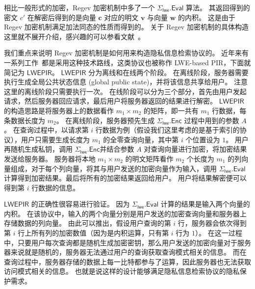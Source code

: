相比一般形式的加密，Regev 加密机制中多了一个 $\Sigma_{\mathsf{lwe}}.\mathsf{Eval}$ 算法。
其返回得到的密文 $c'$ 在解密后得到的是向量 $\mathbf{c}$ 对应的明文 $\mathbf{v}$  与向量 $\mathbf{w}$ 的内积。
这是由于 Regev 加密机制满足加法同态的性质而得到的。
关于 Regev 加密机制的具体构造这里就不展开介绍，感兴趣的可以参看文献~\cite{regev2009lattices}。

我们重点来说明 Regev 加密机制是如何用来构造隐私信息检索协议的。
近年来有一系列工作~\cite{davidson2023frodopir,henzinger2023one,zhou2023optimal}都是采用这种技术路线，这类协议也被称作 LWE-based PIR，下面就简记为 $\mathsf{LWEPIR}$。
$\mathsf{LWEPIR}$ 分为离线和在线两个阶段。
在离线阶段，服务器需要执行生成全局公共状态信息 (global public state)，并将该信息共享给用户。
注意这里的离线阶段只需要执行一次。
在线阶段可以分为三个部分，首先由用户发起请求，然后服务器回应请求，最后用户将服务器返回的结果进行解密。
$\mathsf{LWEPIR}$ 的构造思路是将服务器上的数据看作 $m_1 \times m_2$ 的矩阵，即一共有 $m_1$ 行数据，每条数据长度为 $m_2$。
在离线阶段，服务器预先生成 $\Sigma_{\mathsf{lwe}}.\mathsf{Enc}$ 过程中用到的参数 $A$。
在查询过程中，以请求第 $i$ 行数据为例（假设我们这里考虑的是基于索引的协议），用户只需要生成长度为 $m_1$ 的全零查询向量，其中第 $i$ 个位置设为 $1$。
用户再随机生成私钥，调用 $\Sigma_{\mathsf{lwe}}.\mathsf{Enc}$并结合参数 $A$ 对查询向量进行加密，将加密结果发送给服务器。
服务器将本地 $m_1 \times m_2$ 的明文矩阵看作 $m_2$ 个长度为 $m_1$ 的列向量组成，对于每个列向量，将其与用户发送的加密向量作为输入，调用 $\Sigma_{\mathsf{lwe}}.\mathsf{Eval}$ 计算得到加密结果。最后将所有的加密结果返回给用户。
用户将结果解密便可以得到第 $i$ 行数据的信息。

$\mathsf{LWEPIR}$ 的正确性很容易进行验证。
因为 $\Sigma_{\mathsf{lwe}}.\mathsf{Eval}$ 计算的结果是输入两个向量的内积。
在该协议中，输入的两个向量分别是用户发送的加密查询向量和服务器上存储数据的列向量。
由此可以推出，假设用户查询的第 $i$ 行，服务器会依次得到第 $i$ 行上所有列的加密数值（因为是内积运算，只有第 $i$ 行为 $1$）。
在这一过程中，只要用户每次查询都是随机生成加密密钥，那么用户发送的加密向量对于服务器来说就是随机的，服务器无法通过用户的查询获取查询模式相关的信息。
而在查询过程中，服务器存储的数据上每一比特都参与了运算，因此服务器也无法获取访问模式相关的信息。
也就是说这样的设计能够满足隐私信息检索协议的隐私保护需求。


